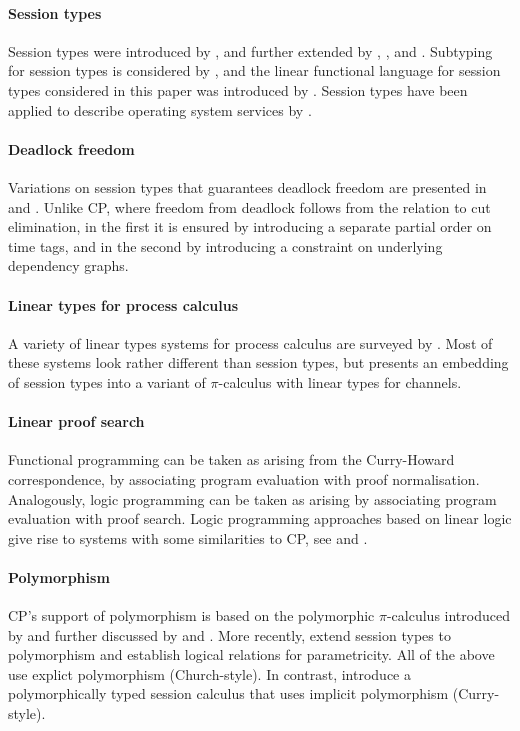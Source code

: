 \documentclass{jfp1}
\begin{document}
\paragraph*{Session types}
Session types were introduced by \citet{Honda93},
and further extended by
\citet{TakeuchiEtAl94},
\citet{HondaEtAl98},
and
\citet{YoshidaVasconcelos07}.
Subtyping for session types is considered by
\citet{GayHole05}, and the linear functional language
for session types considered in this paper was
introduced by
\citet{GayVasconcelos10}.
Session types have been applied to describe
operating system services by \citet{FahndrichEtAl06}.

\paragraph*{Deadlock freedom}
Variations on session types that guarantees deadlock
freedom are presented in \citet{SumiiKobayashi98}
and \citet{CarboneDebois10}.  Unlike CP, where
freedom from deadlock follows from the relation to
cut elimination, in the first it is ensured by
introducing a separate partial order on time tags,
and in the second by introducing a constraint on
underlying dependency graphs.

\paragraph*{Linear types for process calculus}
A variety of linear types systems for process calculus
are surveyed by \citet{Kobayashi02}.  Most of these
systems look rather different than session types, but
\citet{KobayashiPierceTurner96} presents an embedding
of session types into a variant of $\pi$-calculus with
linear types for channels.

\paragraph*{Linear proof search}
Functional programming can be taken as arising from the
Curry-Howard correspondence, by associating program
evaluation with proof normalisation.  Analogously,
logic programming can be taken as arising by
associating program evaluation with proof search.
Logic programming approaches based on linear logic
give rise to systems with some similarities to CP,
see \citet{Miller92} and
\citet{KobayashiYonezawa93,KobayashiYonezawa94,KobayashiYonezawa95}.

\paragraph*{Polymorphism}
CP's support of polymorphism is based on the polymorphic
$\pi$-calculus introduced by \citet{Turner95} and further discussed by
\citet{PierceTurner00} and \citet{PierceSangiorgi00}.  More recently,
\citet{CairesEtAl13} extend session types to polymorphism and
establish logical relations for parametricity.  All of the above
use explict polymorphism (Church-style).  In contrast,
\citet{BergerHondaYoshida05} introduce a polymorphically typed session
calculus that uses implicit polymorphism (Curry-style).
\end{document}
